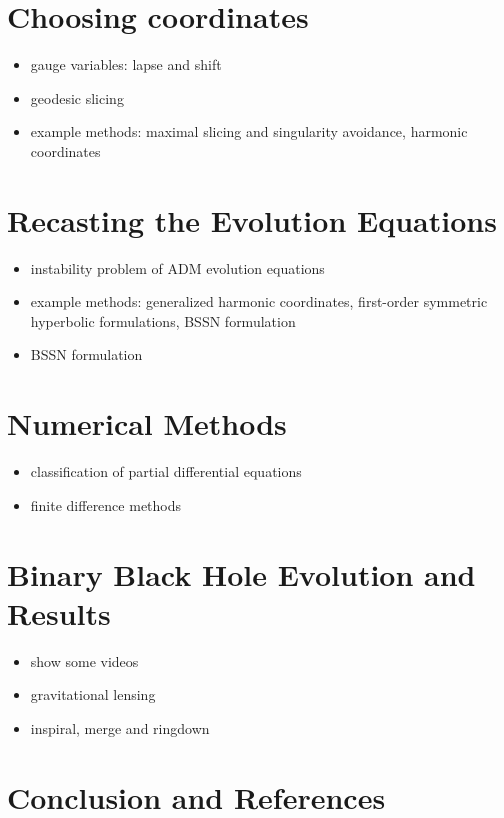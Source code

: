 \documentclass[twocolumn]{article}
\begin{document}
  \section{Choosing coordinates} %
  \label{sec:choosing_coordinates}
    \begin{itemize}
      \item gauge variables: lapse and shift
      \item geodesic slicing
      \item example methods: maximal slicing and singularity avoidance, harmonic coordinates
    \end{itemize}

  \section{Recasting the Evolution Equations} %
  \label{sec:recasting_the_evolution_equations}
    \begin{itemize}
      \item instability problem of ADM evolution equations
      \item example methods: generalized harmonic coordinates, first-order symmetric hyperbolic formulations, BSSN formulation
      \item BSSN formulation
    \end{itemize}

  \section{Numerical Methods} %
  \label{sec:numerical_methods}
    \begin{itemize}
      \item classification of partial differential equations
      \item finite difference methods
    \end{itemize}

  \section{Binary Black Hole Evolution and Results} %
  \label{sec:binary_black_hole_evolution_and_results}
    \begin{itemize}
      \item show some videos
      \item gravitational lensing
      \item inspiral, merge and ringdown
    \end{itemize}

  \section{Conclusion and References} %
  \label{sec:references}

\end{document}
